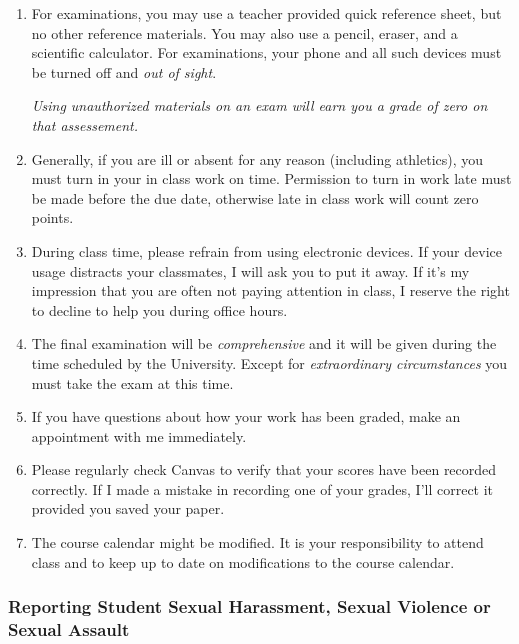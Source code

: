 \documentclass[12pt]{article}
\newcounter{on}\setcounter{on}{0}
\newcounter{ex}\setcounter{ex}{0}
\begin{document}
\begin{enumerate}
\item For examinations, you may use a teacher provided quick reference sheet, 
but no other reference materials. You may also use a pencil, eraser, 
and a scientific calculator. For examinations, your phone and all such
devices must be turned off and \emph{out of sight}. 

\emph{Using unauthorized materials on an exam will earn you a grade of zero on that assessement.}

\item Generally, if you are ill or absent for any reason (including 
athletics), you must turn in your in class work on time. Permission to
turn in work late must be made before the due date, otherwise late in class work 
will count zero points.

\item During class time, please refrain from using electronic devices. If your 
device usage distracts your classmates, I will ask you to put it away. If it's my 
impression that you are often not paying attention in class, I reserve the right to 
decline to help you during office hours.

\item The final examination will be \emph{comprehensive} and it will be given 
during the  time scheduled by the University. Except for \emph{extraordinary circumstances}
you must take the exam at this time.
 
\item If you have questions about how your work has been graded, make an appointment with me immediately.

\item Please regularly check Canvas  to verify that your scores have 
been recorded correctly.  If I made a mistake in recording one of
your grades, I'll correct it provided you saved your paper.

\item The course calendar might be modified. It is your responsibility to attend
class and to keep up to date on modifications to the course calendar.

\end{enumerate}

\newpage

\subsubsection*{Reporting Student Sexual Harassment, Sexual Violence or Sexual Assault}
\end{document}
